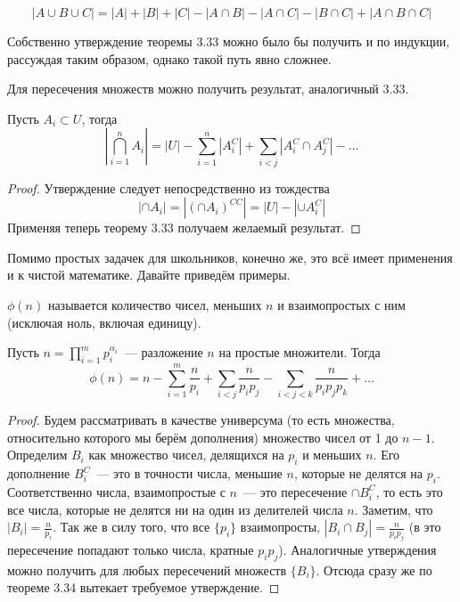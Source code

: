 $$|A\cup B \cup C| = |A| + |B| + |C| - |A\cap B| - |A\cap C| - |B\cap C| + |A\cap B \cap C|$$

Собственно утверждение теоремы 3.33 можно было бы получить и по индукции, рассуждая таким образом, однако такой путь явно сложнее.

Для пересечения множеств можно получить результат, аналогичный 3.33.

\begin{thm}
Пусть $A_i \subset U$, тогда
$$\left|\bigcap_{i=1}^nA_i\right| = |U| - \sum_{i=1}^n|A_i^C| + \sum_{i<j}|A_i^C\cap A_j^C| - \ldots$$
\end{thm}
\begin{proof}
Утверждение следует непосредственно из тождества
$$|\cap A_i| = |(\cap A_i)^{CC}| = |U| - |\cup A_i^C|$$
Применяя теперь теорему 3.33 получаем желаемый результат.
\end{proof}

Помимо простых задачек для школьников, конечно же, это всё имеет применения и к чистой математике. Давайте приведём примеры.

\begin{definition}
 $\phi(n)$ называется количество чисел, меньших $n$ и взаимопростых с ним (исключая ноль, включая единицу).
\end{definition}

\begin{thm}
Пусть $n=\prod_{i=1}^m p_i^{\alpha_i}$~--- разложение $n$ на простые множители. Тогда
$$\phi(n) = n - \sum_{i=1}^m\frac{n}{p_i} + \sum_{i<j}\frac{n}{p_ip_j} - \sum_{i<j<k}\frac{n}{p_ip_jp_k} + \ldots$$
\end{thm}
\begin{proof}
Будем рассматривать в качестве универсума (то есть множества, относительно которого мы берём дополнения) множество чисел от 1 до $n-1$. Определим $B_i$ как множество чисел, делящихся на $p_i$ и меньших $n$. Его дополнение $B_i^C$~--- это в точности числа, меньшие $n$, которые не делятся на $p_i$. Соответственно числа, взаимопростые с $n$~--- это пересечение $\cap B_i^C$, то есть это все числа, которые не делятся ни на один из делителей числа $n$. Заметим, что $|B_i| = \frac{n}{p_i}$. Так же в силу того, что все $\{p_i\}$ взаимопросты, $|B_i\cap B_j| = \frac{n}{p_ip_j}$ (в это пересечение попадают только числа, кратные $p_ip_j$). Аналогичные утверждения можно получить для любых пересечений множеств $\{B_i\}$. Отсюда сразу же по теореме 3.34 вытекает требуемое утверждение.
\end{proof}

